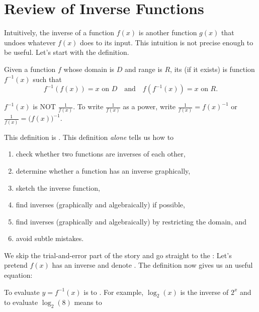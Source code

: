 \documentclass[../main.tex]{subfiles}
\begin{document}
 \section{Review of Inverse Functions}
  Intuitively, the inverse of a function \(f(x)\) is another function \(g(x)\) that undoes whatever \(f(x)\) does to its input. This intuition is not precise enough to be useful. Let's start with the definition.

  \begin{mdframed}[style=withref-compact]
    Given a function \(f\) whose domain is \(D\) and range is \(R\), its  (if it exists) is  function \(f^{-1}(x)\) such that
    \[
      f^{-1}(f(x)) = x \text{ on } D \quad\text{and}\quad f(f^{-1}(x)) = x \text{ on } R.
    \]

  \end{mdframed}

  {\faExclamationTriangle{} \(f^{-1}(x)\) is NOT \(\tfrac{1}{f(x)}\). To write \(\tfrac{1}{f(x)}\) as a power, write \(\tfrac{1}{f(x)} = f(x)^{-1}\) or \(\tfrac{1}{f(x)} = \big( f(x) \big)^{-1}\).}
  \bigskip

  This definition is . This definition \emph{alone} tells us how to
  \begin{enumerate}[noitemsep]
    \item check whether two functions are inverses of each other, 
    \item determine whether a function has an inverse graphically, 
    \item sketch the inverse function, 
    \item find inverses (graphically and algebraically) if possible,
    \item find inverses (graphically and algebraically) by restricting the domain, and
    \item avoid subtle mistakes.
  \end{enumerate}

  We skip the trial-and-error part of the story and go straight to the : Let's pretend \(f(x)\) has an inverse and denote \underline{\hspace{2in}}. The definition now gives us an useful equation:

  To evaluate \(y = f^{-1}(x)\) is to \underline{\hspace{4in}}. For example, \(\log_{2}(x)\) is the inverse of \(2^{x}\) and to evaluate \(\log_{2}(8)\) means to 
\end{document}
